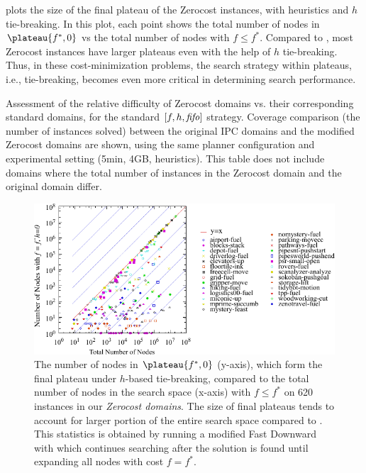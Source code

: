  plots the size of the final plateau of the
Zerocost instances, with \lmcut heuristics and $h$ tie-breaking. In this plot,
each point shows the total number of nodes in $\plateau{f^*,0}$ vs the
total number of nodes with $f\leq f^*$. Compared to ,
most Zerocost instances have larger plateaus even with the help of
$h$ tie-breaking.  Thus, in these cost-minimization problems, the search
strategy within plateaus, i.e., tie-breaking, becomes even more critical
in determining search performance.


\begin{table}[htbp]
 \centering
 
 \caption{
 Assessment of the relative difficulty of Zerocost domains vs. their corresponding standard domains, for the standard $[f,h,{\text{\textit{fifo}}}]$ strategy.
 Coverage comparison (the number of instances solved) 
 between the original IPC domains and the modified Zerocost domains are shown, 
 using the same planner configuration and experimental setting (5min, 4GB, \lmcut heuristics).
 This table does not include domains where the total number of instances
 in the Zerocost domain  and the original domain differ. 
 }
 \label{tbl:lmcut-zerocost-std}
\end{table}

\begin{figure}[htbp]
  \centering
  \includegraphics{tables/aaai16-frontier/zerocost/lmcut_frontier-front.pdf}
  \caption{
 The number of nodes in $\plateau{f^*, 0}$ (y-axis), which form
  the final plateau under $h$-based tie-breaking, compared to
 the total number of nodes in the search space (x-axis) with
 $f\leq f^*$ on 620 instances in our \emph{Zerocost domains}.
 The size of final plateaus tends to account for larger portion of the
 entire search space compared to .
 This statistics is obtained by running a modified Fast Downward with
 \lmcut which continues searching after the solution is found
 until expanding all nodes with cost $f=f^*$.
 }
 \label{fig:plateau-zerocost}
\end{figure}

